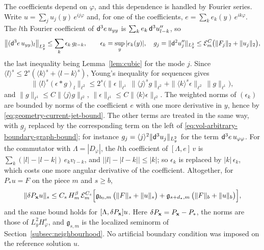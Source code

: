 The coefficients depend on $\varphi$, and this dependence is handled
by Fourier series. Write $u=\sum_ju_j(y)\,e^{ij\varphi}$ and, for one
of the coefficients, $e=\sum_ke_k(y)\,e^{ik\varphi}$. The $l$th
Fourier coefficient of $\mathsf d^3e\,u_{yy}$ is
$\sum_ke_k\,\mathsf d^3u_{l-k}''$, so
\[
 \bigl\|(\mathsf d^3e\,u_{yy})_l\bigr\|_{L^2_y}\le\sum_k\epsilon_k\,g_{l-k},
 \qquad \epsilon_k=\sup_y|e_k(y)|,\quad
 g_j=\|\mathsf d^2u_j''\|_{L^2_y}
 \le\mathcal E_m^C\bigl(\|F_j\|_2+\|u_j\|_2\bigr),
\]
the last inequality being Lemma~\ref{lem:cubic} for the mode $j$.
Since $\langle l\rangle^s\le2^s(\langle k\rangle^s+\langle l-k\rangle^s)$,
Young's inequality for sequences gives
\begin{equation}\label{eq:sequence-convolution}
 \bigl\|\langle l\rangle^s(\epsilon*g)_l\bigr\|_{\ell^2}
 \le2^s\bigl(\|\epsilon\|_{\ell^1}\,\|\langle j\rangle^sg\|_{\ell^2}
 +\|\langle k\rangle^s\epsilon\|_{\ell^2}\,\|g\|_{\ell^1}\bigr),
\end{equation}
and $\|g\|_{\ell^1}\le C\|\langle j\rangle g\|_{\ell^2}$,
$\|\epsilon\|_{\ell^1}\le C\|\langle k\rangle\epsilon\|_{\ell^2}$.
The weighted norms of $(\epsilon_k)$ are bounded by norms of the
coefficient $e$ with one more derivative in $y$, hence by
\eqref{eq:geometry-current-jet-bound}. The other terms are treated in
the same way, with $g_j$ replaced by the corresponding term on the
left of \eqref{eq:vol-arbitrary-boundary-graph-bound}; for instance
$g_j=\langle j\rangle^2\|\mathsf d^3u_j\|_{L^2_y}$ for the term
$\mathsf d^3e\,u_{\varphi\varphi}$. For the commutator with
$\Lambda=|D_\varphi|$, the $l$th coefficient of $[\Lambda,e]\,v$ is
$\sum_k(|l|-|l-k|)\,e_kv_{l-k}$, and
$\bigl||l|-|l-k|\bigr|\le|k|$; so $\epsilon_k$ is replaced by
$|k|\,\epsilon_k$, which costs one more angular derivative of the
coefficient. Altogether, for $P_*u=F$ on the piece $m$ and $s\ge b$,
\begin{equation}\label{eq:readable-positive-relative-bound}
 \|\delta P_{\mathbf x}u\|_s
 \le C_s\,H_m^\beta\,\mathcal E_m^{C_s}
 \Bigl[\mathfrak g_{b_0,m}\,\bigl(\|F\|_s+\|u\|_s\bigr)
       +\mathfrak g_{s+d_*,m}\,\bigl(\|F\|_b+\|u\|_b\bigr)\Bigr],
\end{equation}
and the same bound holds for $[\Lambda,\delta P_{\mathbf x}]u$. Here
$\delta P_{\mathbf x}=P_{\mathbf x}-P_*$, the norms are those of
$L^2_yH^s_\varphi$, and $\mathfrak g_{s,m}$ is the localized seminorm
of Section~\ref{subsec:neighbourhood}. No artificial boundary
condition was imposed on the reference solution $u$.

